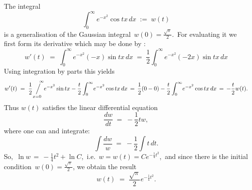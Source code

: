 \documentclass[12pt]{article}
\newcommand{\sijoitus}[2]%
{\operatornamewithlimits{\Big/}_{\!\!\!#1}^{\,#2}}
\begin{document}
The integral
$$\int_0^\infty\!e^{-x^2}\cos{tx}\,dx \;:=\; w(t)$$
is a generalisation of the Gaussian integral \,$w(0) = \frac{\sqrt{\pi}}{2}$.\, For evaluating it we first form its derivative which may be done by :
$$w'(t) \;=\; \int_0^\infty\!e^{-x^2}(-x)\sin{tx}\,dx 
\;=\; \frac{1}{2}\int_0^\infty\!e^{-x^2}(-2x)\sin{tx}\,dx$$
Using integration by parts this yields
$$w'(t) \;=\; \frac{1}{2}\!\sijoitus{x=0}{\quad\infty}\!e^{-x^2}\sin{tx}-\frac{t}{2}\int_0^\infty\!e^{-x^2}\cos{tx}\,dx
\,=\, \frac{1}{2}(0-0)-\frac{t}{2}\int_0^\infty\!e^{-x^2}\cos{tx}\,dx \,=\, -\frac{t}{2}w(t).$$
Thus $w(t)$ satisfies the linear differential equation
$$\frac{dw}{dt} \;=\; -\frac{1}{2}tw,$$
where one can  and integrate:
$$\int\!\frac{dw}{w} \;=\; -\frac{1}{2}\int\!t\,dt.$$
So,\, $\ln{w} \,=\, -\frac{1}{4}t^2+\ln{C}$,\, i.e.\, $w = w(t) = Ce^{-\frac{1}{4}t^2}$,\, 
and since there is the initial condition\, $w(0) = \frac{\sqrt{\pi}}{2}$, we obtain the result
$$w(t) \;=\; \frac{\sqrt{\pi}}{2}e^{-\frac{1}{4}t^2}.$$


\end{document}
